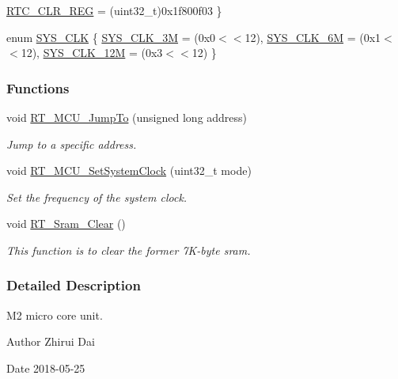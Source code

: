 \begin{DoxyCompactItemize}
\mbox{\hyperlink{a00020_adadaa0ab1ebbd7ba9b70dfd24c3ed44dabc51699db6321ee7f233162735869f70}{R\+T\+C\+\_\+\+C\+L\+R\+\_\+\+R\+EG}} = (uint32\+\_\+t)0x1f800f03
 \}
\item 
enum \mbox{\hyperlink{a00020_ae3a2d501b8662e11b969fb4a5e195e5b}{S\+Y\+S\+\_\+\+C\+LK}} \{ \mbox{\hyperlink{a00020_ae3a2d501b8662e11b969fb4a5e195e5baaac7754daa9ff2db35951f3539495122}{S\+Y\+S\+\_\+\+C\+L\+K\+\_\+3M}} = (0x0$<$$<$12), 
\mbox{\hyperlink{a00020_ae3a2d501b8662e11b969fb4a5e195e5bad1640aa8c46162a7551abca12293ef39}{S\+Y\+S\+\_\+\+C\+L\+K\+\_\+6M}} = (0x1$<$$<$12), 
\mbox{\hyperlink{a00020_ae3a2d501b8662e11b969fb4a5e195e5ba6c646c9a1e4c38ef0af6d576eacfb401}{S\+Y\+S\+\_\+\+C\+L\+K\+\_\+12M}} = (0x3$<$$<$12)
 \}
\end{DoxyCompactItemize}
\subsubsection*{Functions}
\begin{DoxyCompactItemize}
\item 
void \mbox{\hyperlink{a00020_aa106e3c9181a65a83156bda31f4f61e9}{R\+T\+\_\+\+M\+C\+U\+\_\+\+Jump\+To}} (unsigned long address)
\begin{DoxyCompactList}\small\item\em Jump to a specific address. \end{DoxyCompactList}\item 
void \mbox{\hyperlink{a00020_a1e578ce669735935a1d505c0edf98221}{R\+T\+\_\+\+M\+C\+U\+\_\+\+Set\+System\+Clock}} (uint32\+\_\+t mode)
\begin{DoxyCompactList}\small\item\em Set the frequency of the system clock. \end{DoxyCompactList}\item 
void \mbox{\hyperlink{a00020_ad514417aa2e5a5d061a5eabeceae20c6}{R\+T\+\_\+\+Sram\+\_\+\+Clear}} ()
\begin{DoxyCompactList}\small\item\em This function is to clear the former 7\+K-\/byte sram. \end{DoxyCompactList}\end{DoxyCompactItemize}


\subsubsection{Detailed Description}
M2 micro core unit. 

\begin{DoxyAuthor}{Author}
Zhirui Dai 
\end{DoxyAuthor}
\begin{DoxyDate}{Date}
2018-\/05-\/25 
\end{DoxyDate}


